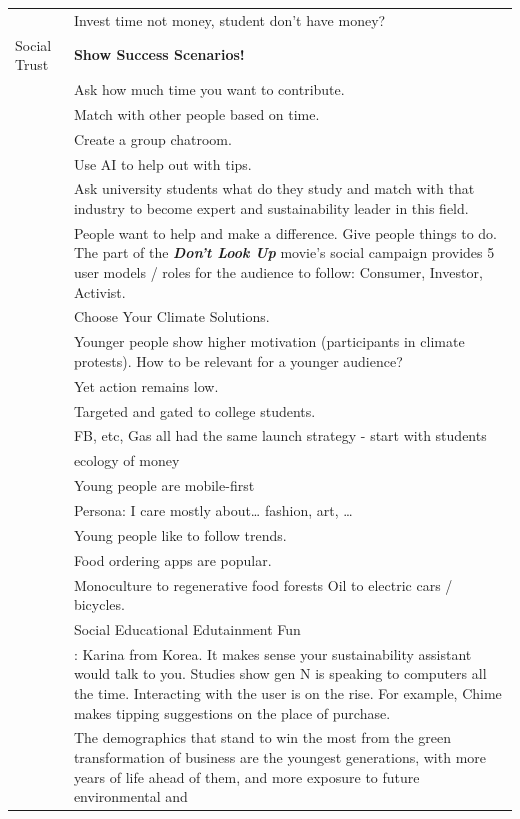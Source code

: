 \documentclass[
  letterpaper,
  DIV=11,
  numbers=noendperiod]{scrartcl}
\begin{document}
\begin{longtable}[]{@{}
  >{\raggedright\arraybackslash}p{}
  >{\raggedright\arraybackslash}p{}@{}}
& Invest time not money, student don't have money? \\
Social Trust & \textbf{Show Success Scenarios!} \\
& Ask how much time you want to contribute. \\
& Match with other people based on time. \\
& Create a group chatroom. \\
& Use AI to help out with tips. \\
& Ask university students what do they study and match with that
industry to become expert and sustainability leader in this field. \\
& People want to help and make a difference. Give people things to do.
The \citet{dontlookupMethodology} part of the \textbf{\emph{Don't Look
Up}} movie's social campaign provides 5 user models / roles for the
audience to follow: Consumer, Investor, Activist. \\
& Choose Your Climate Solutions. \\
& Younger people show higher motivation (participants in climate
protests). How to be relevant for a younger audience? \\
& Yet action remains low. \\
& Targeted and gated to college students. \\
& FB, etc, Gas all had the same launch strategy - start with students \\
& \citet{kuzminskiEcologyMoneyDebt2015} ecology of money \\
& Young people are mobile-first \\
& Persona: I care mostly about\ldots{} fashion, art, \ldots{} \\
& Young people like to follow trends. \\
& Food ordering apps are popular. \\
& Monoculture to regenerative food forests Oil to electric cars /
bicycles. \\
& Social Educational Edutainment Fun \\
& \citet{aespaAespaEseupaMY2020}: Karina from Korea. It makes sense your
sustainability assistant would talk to you. Studies show gen N is
speaking to computers all the time. Interacting with the user is on the
rise. For example, Chime makes tipping suggestions on the place of
purchase. \\
& The demographics that stand to win the most from the green
transformation of business are the youngest generations, with more years
of life ahead of them, and more exposure to future environmental and

\end{longtable}
\end{document}
